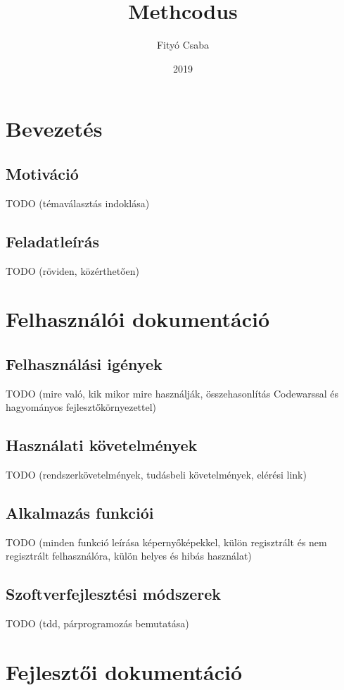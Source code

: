 \documentclass{elteikthesis}
\title{Methcodus}
\date{2019}
\author{Fityó Csaba}
\affiliation{TODO}
\begin{document}
	\maketitle
	\tableofcontents

	\chapter{Bevezetés}
	\section{Motiváció}
	TODO (témaválasztás indoklása)

	\section{Feladatleírás}
	TODO (röviden, közérthetően)

	\chapter{Felhasználói dokumentáció}
	\section{Felhasználási igények}
	TODO (mire való, kik mikor mire használják, összehasonlítás Codewarssal és hagyományos fejlesztőkörnyezettel)
	
	\section{Használati követelmények}
	TODO (rendszerkövetelmények, tudásbeli követelmények, elérési link)
	
	\section{Alkalmazás funkciói}
	TODO (minden funkció leírása képernyőképekkel, külön regisztrált és nem regisztrált felhasználóra, külön helyes és hibás használat)
	
	\section{Szoftverfejlesztési módszerek}
	TODO (tdd, párprogramozás bemutatása)

	\chapter{Fejlesztői dokumentáció}
\end{document}
